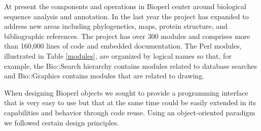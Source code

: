 \documentclass[12pt]{article}
\begin{document}
At present the components and operations in Bioperl center around
biological sequence analysis and annotation.  In the last year the
project has expanded to address new areas including phylogenetics,
maps, protein structure, and bibliographic references.  The project
has over 300 modules and comprises more than 160,000 lines of code and
embedded documentation.  The Perl modules, illustrated in Table
\ref{modules}, are organized by logical names so that, for example,
the Bio::Search hierarchy contains modules related to database
searches and Bio::Graphics contains modules that are related to
drawing.

When designing Bioperl objects we sought to provide a
programming interface that is very easy to use but that at the same
time could be easily extended in its capabilities and behavior through
code reuse.  Using an object-oriented paradigm we followed certain
design principles.
\end{document}
